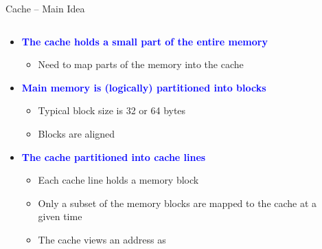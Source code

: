 \documentclass[aspectratio=169,12pt]{beamer}
\begin{document}
\begin{frame}{Cache -- Main Idea}
\begin{columns}[T]
\begin{column}{0.65\textwidth}
\begin{itemize}
  \item \textcolor{blue}{\textbf{The cache holds a small part of the entire memory}}
  \begin{itemize}
    \item Need to map parts of the memory into the cache
  \end{itemize}
  
  \item \textcolor{blue}{\textbf{Main memory is (logically) partitioned into blocks}}
  \begin{itemize}
    \item Typical block size is 32 or 64 bytes
    \item Blocks are aligned
  \end{itemize}
  
  \item \textcolor{blue}{\textbf{The cache partitioned into cache lines}}
  \begin{itemize}
    \item Each cache line holds a memory block
    \item Only a subset of the memory blocks are mapped to the cache at a given time
    \item The cache views an address as
  \end{itemize}
\end{itemize}

\vspace{0.3cm}
\begin{center}
\end{center}
\end{column}

\begin{column}{0.35\textwidth}
\end{column}
\end{columns}
\end{frame}
\end{document}
